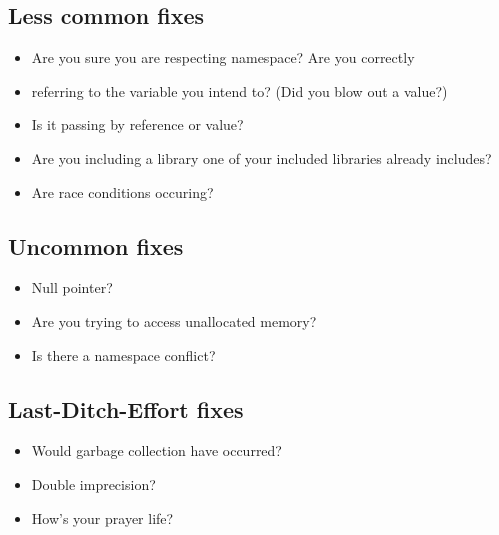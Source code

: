 \documentclass[12pt]{article}
\begin{document}
  \subsection{Less common fixes}
    \begin{itemize}
      \item Are you sure you are respecting namespace? Are you correctly
      \item referring to the variable you intend to? (Did you blow out a
      value?)
      \item Is it passing by reference or value?
      \item Are you including a library one of your included libraries already
    includes?
      \item Are race conditions occuring?
    \end{itemize}
  \subsection{Uncommon fixes}
    \begin{itemize}
      \item Null pointer?
      \item Are you trying to access unallocated memory?
      \item Is there a namespace conflict?
    \end{itemize}
  \subsection{Last-Ditch-Effort fixes}
    \begin{itemize}
      \item Would garbage collection have occurred?
      \item Double imprecision?
      \item How's your prayer life?
    \end{itemize}
\end{document}
